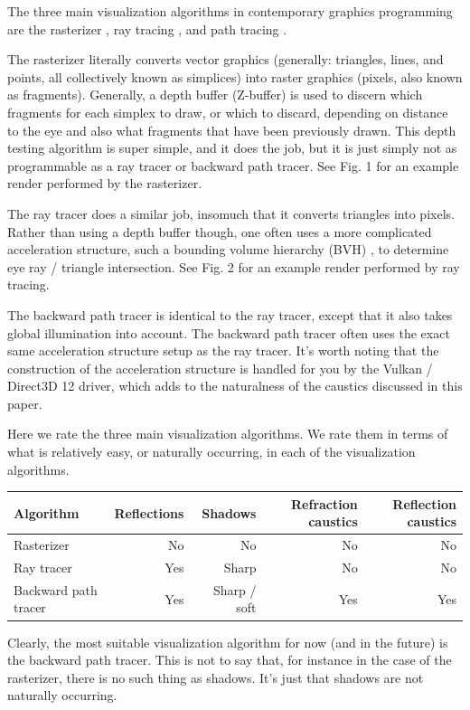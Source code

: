 \documentclass[12pt]{article}
\begin{document}
The three main visualization algorithms in contemporary graphics programming are the rasterizer \cite{noll, wikipedia1}, ray tracing \cite{appel, wikipedia2}, and path tracing \cite{kajiya, wikipedia3}.

The rasterizer literally converts vector graphics (generally: triangles, lines, and points, all collectively known as simplices) into raster graphics (pixels, also known as fragments).
Generally, a depth buffer (Z-buffer) \cite{wikipedia4} is used to discern which fragments for each simplex to draw, or which to discard, depending on distance to the eye and also what fragments that have been previously drawn.
This depth testing algorithm is super simple, and it does the job, but it is just simply not as programmable as a ray tracer or backward path tracer.
See Fig. 1 for an example render performed by the rasterizer.

The ray tracer does a similar job, insomuch that it converts triangles into pixels.
Rather than using a depth buffer though, one often uses a more complicated acceleration structure, such a bounding volume hierarchy (BVH) \cite{wikipedia5}, to determine eye ray / triangle intersection.
See Fig. 2 for an example render performed by ray tracing.

The backward path tracer is identical to the ray tracer, except that it also takes global illumination into account.
The backward path tracer often uses the exact same acceleration structure setup as the ray tracer.
It's worth noting that the construction of the acceleration structure is handled for you by the Vulkan / Direct3D 12 driver, which adds to the naturalness of the caustics discussed in this paper.

Here we rate the three main visualization algorithms.
We rate them in terms of what is relatively easy, or naturally occurring, in each of the visualization algorithms.
\begin{center}
\begin{tabular}{| l | r | r | r | r |}
  \hline
 Algorithm &  Reflections & Shadows & Refraction caustics & Reflection caustics \\
\hline
\hline
Rasterizer & No & No & No &  No \\
Ray tracer & Yes & Sharp & No & No  \\
Backward path tracer & Yes & Sharp / soft & Yes & Yes \\
  \hline  
\end{tabular}
\end{center}
Clearly, the most suitable visualization algorithm for now (and in the future) is the backward path tracer.
This is not to say that, for instance in the case of the rasterizer, there is no such thing as shadows.
It's just that shadows are not naturally occurring.
\end{document}
